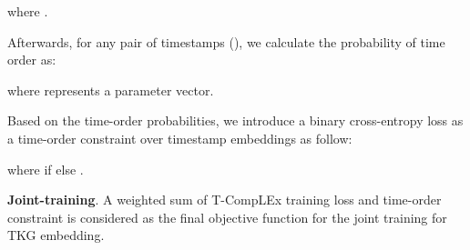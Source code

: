 \documentclass[11pt]{article}
\newcommand{\xhdr}[1]{{\noindent\bfseries #1}.}
\begin{document}
where .

Afterwards, for any pair of timestamps (),  we calculate the probability of time order as:

where  represents a parameter vector.

Based on the time-order probabilities, we introduce a binary cross-entropy loss as a time-order constraint over timestamp embeddings as follow:

where  if  else .

\xhdr{Joint-training} 
A weighted sum of T-CompLEx training loss and time-order constraint is considered as the final objective function for the joint training for TKG embedding.





\begin{comment}
Since we focus on using KG embeddings to perform temporal KGQA, we investigate how to encode the entities, relations, and timestamps from a
temporal KG in a continuous low-dimensional vector space (called embeddings). These embeddings are then used for answering the temporal questions, which usually need multiple facts and the temporal order of these facts. For example, to answer the `Who is the President of USA before William J. Clinton?'', we need not only the two facts (President of USA, Position Held, Ronald Reagan, [1981, 1989]) and (President of USA, Position Held, William J. Clinton, [1993, 2001]), but also the order of them. However, most models \cite{lacroix2020tensor,jain2020temporal} are designed for knowledge graph completion that only cares about one fact instead of the order of them. 

For solving this challenge, we investigate the way to keep the timeline in embedding space.  
In our paper, inspired by position embedding \cite{vaswani2017attention} proposed in the language model, we add learnable temporal positional encodings to KG.
We get the initial position encoding as follows:

where pos is the position, i is the dimension and d is the dimension of the time positional encoding. Note these encodings are used as the initial time embeddings for training the link prediction. 

Then we use a specific KG embedding model named TCompLEx \cite{lacroix2020tensor} to predict the positive and negative tuples in an incomplete temporal KG. 
The TCompLEx is an extension of ComplEx with time. Each timestamp t is represented as a vector .  Here the TComplEx scoring
function is

where Re(.) denotes the real part of a complex vector, and  denotes the trilinear product.

In addition to this score function, in order to encode the order of timestamps, we add a simple temporal order loss as follow:

where  is the parameter vector.

\end{comment}
\end{document}

